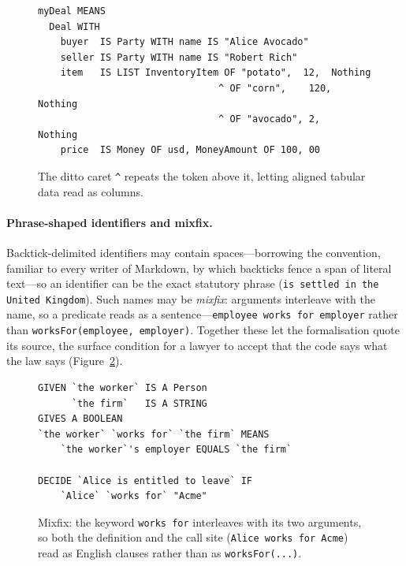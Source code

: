 \documentclass[sigconf,nonacm]{acmart}
\newcommand{\bq}{\char96\relax}            %
\newcommand{\code}[1]{\texttt{\small #1}}
\begin{document}
\begin{figure}[t]
\begin{lstlisting}
myDeal MEANS
  Deal WITH
    buyer  IS Party WITH name IS "Alice Avocado"
    seller IS Party WITH name IS "Robert Rich"
    item   IS LIST InventoryItem OF "potato",  12,  Nothing
                                ^ OF "corn",    120, Nothing
                                ^ OF "avocado", 2,   Nothing
    price  IS Money OF usd, MoneyAmount OF 100, 00
\end{lstlisting}
\caption{The ditto caret \code{\textasciicircum} repeats the token above it, letting
aligned tabular data read as columns.}
\label{fig:ditto}
\end{figure}

\paragraph{Phrase-shaped identifiers and mixfix.}
Backtick-delimited identifiers may contain spaces---borrowing the convention,
familiar to every writer of Markdown, by which backticks fence a span of literal
text---so an identifier can be the exact statutory phrase
(\code{\bq is settled in the United Kingdom\bq}).
Such names may be \emph{mixfix}: arguments interleave with the name, so a
predicate reads as a sentence---\code{\bq employee\bq{} \bq works for\bq{} \bq employer\bq}
rather than \code{worksFor(employee, employer)}. Together these let the
formalisation quote its source, the surface condition for a lawyer to accept
that the code says what the law says (Figure~\ref{fig:mixfix}).

\begin{figure}[t]
\begin{lstlisting}
GIVEN `the worker` IS A Person
      `the firm`   IS A STRING
GIVES A BOOLEAN
`the worker` `works for` `the firm` MEANS
    `the worker`'s employer EQUALS `the firm`

DECIDE `Alice is entitled to leave` IF
    `Alice` `works for` "Acme"
\end{lstlisting}
\caption{Mixfix: the keyword \code{\bq works for\bq} interleaves with its two
arguments, so both the definition and the call site
(\code{\bq Alice\bq{} \bq works for\bq{} \bq Acme\bq}) read as English clauses
rather than as \code{worksFor(...)}.}
\label{fig:mixfix}
\end{figure}
\end{document}
